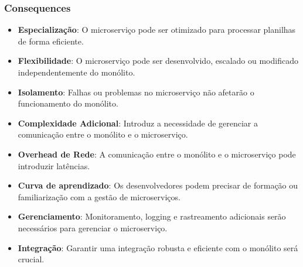 \subsubsection*{Consequences}
\begin{itemize}
	\item \textbf{Especialização}: O microserviço pode ser otimizado para processar planilhas de forma eficiente.
	\item \textbf{Flexibilidade}: O microserviço pode ser desenvolvido, escalado ou modificado independentemente do monólito.
	\item \textbf{Isolamento}: Falhas ou problemas no microserviço não afetarão o funcionamento do monólito.
	\item \textbf{Complexidade Adicional}: Introduz a necessidade de gerenciar a comunicação entre o monólito e o microserviço.
	\item \textbf{Overhead de Rede}: A comunicação entre o monólito e o microserviço pode introduzir latências.
	\item \textbf{Curva de aprendizado}: Os desenvolvedores podem precisar de formação ou familiarização com a gestão de microserviços.
	\item \textbf{Gerenciamento}: Monitoramento, logging e rastreamento adicionais serão necessários para gerenciar o microserviço.
	\item \textbf{Integração}: Garantir uma integração robusta e eficiente com o monólito será crucial.
\end{itemize}
